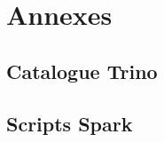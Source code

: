 \documentclass[a4paper,11pt]{article}
\begin{document}
\section{Annexes}
\subsection{Catalogue Trino}

\subsection{Scripts Spark}



\end{document}
